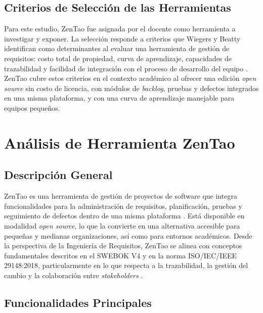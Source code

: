 \documentclass[journal,onecolumn]{IEEEtran}
\begin{document}
\subsection{Criterios de Selección de las Herramientas}

Para este estudio, ZenTao fue asignada por el docente como herramienta a investigar y exponer.
La selección responde a criterios que Wiegers y Beatty identifican como determinantes al evaluar
una herramienta de gestión de requisitos: costo total de propiedad, curva de aprendizaje,
capacidades de trazabilidad y facilidad de integración con el proceso de desarrollo del equipo
\cite{wiegers2013}. ZenTao cubre estos criterios en el contexto académico al ofrecer una edición
\textit{open source} sin costo de licencia, con módulos de \textit{backlog}, pruebas y defectos
integrados en una misma plataforma, y con una curva de aprendizaje manejable para equipos pequeños.
\newpage

\section{Análisis de Herramienta ZenTao}

\subsection{Descripción General}

ZenTao es una herramienta de gestión de proyectos de software que integra funcionalidades para
la administración de requisitos, planificación, pruebas y seguimiento de defectos dentro de una
misma plataforma \cite{zentao2025}. Está disponible en modalidad \textit{open source}, lo que la
convierte en una alternativa accesible para pequeñas y medianas organizaciones, así como para
entornos académicos. Desde la perspectiva de la Ingeniería de Requisitos, ZenTao se alinea con
conceptos fundamentales descritos en el SWEBOK V4 y en la norma ISO/IEC/IEEE 29148:2018,
particularmente en lo que respecta a la trazabilidad, la gestión del cambio y la colaboración
entre \textit{stakeholders} \cite{iso29148}.

\subsection{Funcionalidades Principales}
\end{document}

